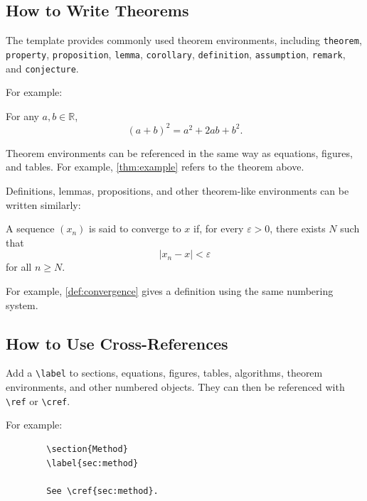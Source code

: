 \documentclass{article}
\begin{document}
	
	\subsection{How to Write Theorems}
	
	The template provides commonly used theorem environments, including \texttt{theorem}, \texttt{property}, \texttt{proposition}, \texttt{lemma}, \texttt{corollary}, \texttt{definition}, \texttt{assumption}, \texttt{remark}, and \texttt{conjecture}.
	
	For example:
	
	\begin{theorem}
		\label{thm:example}
		For any $a,b \in \mathbb{R}$,
		\[
		(a+b)^2 = a^2 + 2ab + b^2.
		\]
	\end{theorem}
	
	Theorem environments can be referenced in the same way as equations, figures, and tables. For example, \cref{thm:example} refers to the theorem above.
	
	Definitions, lemmas, propositions, and other theorem-like environments can be written similarly:
	
	\begin{definition}
		\label{def:convergence}
		A sequence $(x_n)$ is said to converge to $x$ if, for every
		$\varepsilon > 0$, there exists $N$ such that
		\[
		|x_n - x| < \varepsilon
		\]
		for all $n \geq N$.
	\end{definition}
	
	For example, \cref{def:convergence} gives a definition using the same numbering system.
	
	
	\subsection{How to Use Cross-References}
	
	Add a \verb|\label| to sections, equations, figures, tables, algorithms, theorem environments, and other numbered objects. They can then be referenced with \verb|\ref| or \verb|\cref|.
	
	For example:
	
	\begin{verbatim}
		\section{Method}
		\label{sec:method}
		
		See \cref{sec:method}.
	\end{verbatim}
	
\end{document}
